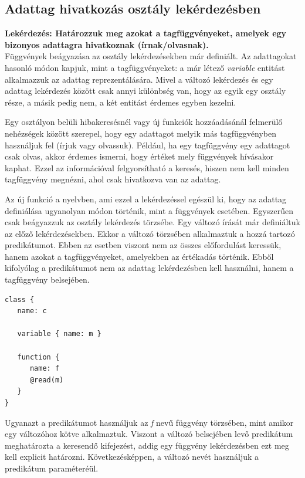 \documentclass[a4paper,12pt]{report}
\begin{document}
\subsection{Adattag hivatkozás osztály lekérdezésben}
\textbf{Lekérdezés: Határozzuk meg azokat a tagfüggvényeket, amelyek egy bizonyos adattagra hivatkoznak (írnak/olvasnak).}
\\
Függvények beágyazása az osztály lekérdezésekben már definiált. Az adattagokat hasonló módon kapjuk, mint a tagfüggvényeket: a már létező \textit{variable} entitást alkalmazzuk az adattag reprezentálására. Mivel a változó lekérdezés és egy adattag lekérdezés között csak annyi különbség van, hogy az egyik egy osztály része, a másik pedig nem, a két entitást érdemes egyben kezelni.
\par Egy osztályon belüli hibakeresésnél vagy új funkciók hozzáadásánál felmerülő nehézségek között szerepel, hogy egy adattagot melyik más tagfüggvényben használjuk fel (írjuk vagy olvassuk). Például, ha egy tagfüggvény egy adattagot csak olvas, akkor érdemes ismerni, hogy értéket mely függvények hívásakor kaphat. Ezzel az információval felgyorsítható a keresés, hiszen nem kell minden tagfüggvény megnézni, ahol csak hivatkozva van az adattag.
\par Az új funkció a nyelvben, ami ezzel a lekérdezéssel egészül ki, hogy az adattag definiálása ugyanolyan módon történik, mint a függvények esetében. Egyszerűen csak beágyazzuk az osztály lekérdezés törzsébe. Egy változó írását már definiáltuk az előző lekérdezésekben. Ekkor a változó törzsében alkalmaztuk a hozzá tartozó predikátumot. Ebben az esetben viszont nem az összes előfordulást keressük, hanem azokat a tagfüggvényeket, amelyekben az értékadás történik. Ebből kifolyólag a predikátumot nem az adattag lekérdezésben kell használni, hanem a tagfüggvény belsejében.
\begin{verbatim}
class {
   name: c
   
   variable { name: m }
   
   function { 
      name: f 
      @read(m)
   }
}
\end{verbatim}
\par Ugyanazt a predikátumot használjuk az \textit{f} nevű függvény törzsében, mint amikor egy változóhoz kötve alkalmaztuk. Viszont a változó belsejében levő predikátum meghatározta a keresendő kifejezést, addig egy függvény lekérdezésben ezt meg kell explicit határozni. Következésképpen, a változó nevét használjuk a predikátum paraméteréül.
\end{document}
